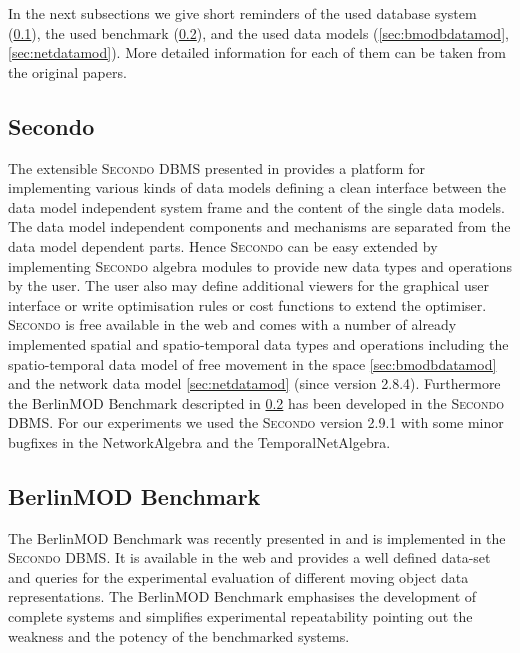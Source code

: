 \documentclass[a4paper]{article}
\newcommand{\secondo}{\textsc{Secondo}}
\newcommand{\bmodb} {BerlinMOD Benchmark}
\begin{document}
In the next subsections we give short reminders of the used database system (\ref{sec:secondo}), the used benchmark (\ref{sec:bmodb}), and the used data models (\ref{sec:bmodbdatamod}, \ref{sec:netdatamod}). More detailed information for each of them can be taken from the original papers.
\subsection{Secondo}
\label{sec:secondo}
The extensible \secondo{} DBMS presented in \cite{686903,1054151} provides a platform for implementing various kinds of data models defining a clean interface between the data model independent system frame and the content of the single data models. The data model independent components and mechanisms are separated from the data model dependent parts. Hence \secondo{} can be easy extended by implementing \secondo{} algebra modules to provide new data types and operations by the user. The user also may define additional viewers for the graphical user interface or write optimisation rules or cost functions to extend the optimiser. \secondo{} is free available in the web \cite{secondoweb} and comes with a number of already implemented spatial and spatio-temporal data types and operations including the spatio-temporal data model of free movement in the space \ref{sec:bmodbdatamod} and the network data model \ref{sec:netdatamod} (since version 2.8.4). Furthermore the \bmodb{} descripted in \ref{sec:bmodb} has been developed in the \secondo{} DBMS. For our experiments we used the \secondo{} version 2.9.1 with some minor bugfixes in the NetworkAlgebra and the TemporalNetAlgebra.
\subsection{BerlinMOD Benchmark}
\label{sec:bmodb}
The \bmodb{} was recently presented in \cite{BerlinMODVLDB} \nocite{BerlinMOD} and is implemented in the \secondo{} DBMS. It is available in the web \cite{berlinmodweb} and provides a well defined data-set and queries for the experimental evaluation of different moving object data representations. The \bmodb{} emphasises the development of complete systems and simplifies experimental repeatability pointing out the weakness and the potency of the benchmarked systems.
\end{document}
